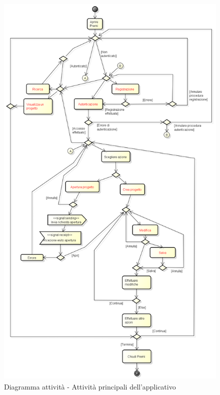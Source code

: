 \begin{figure}[p] 
	\centering 
	\includegraphics[height=20cm, keepaspectratio] {img/Activity_diagram.png} 
	\caption{Diagramma attività - Attività principali dell'applicativo \PROGETTO} 
\end{figure}

\newpage

